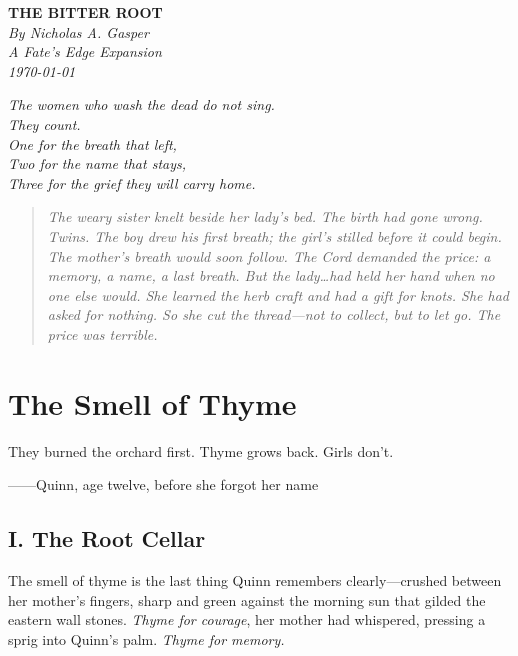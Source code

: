 \documentclass[11pt]{book}
\begin{document}


\thispagestyle{empty}
\vspace*{2cm}
\begin{center}
    {\LARGE\bfseries\color{ashgray}THE BITTER ROOT}\\[1.5cm]
    {\large\itshape By Nicholas A. Gasper}\\[2cm]
    {\large\itshape A Fate's Edge Expansion}\\[1cm]
    {\large\itshape \today}
\end{center}
\newpage

\thispagestyle{empty}
\vspace*{3cm}
\begin{flushright}
    {\large\itshape The women who wash the dead do not sing.\\
    They count.\\
    One for the breath that left,\\
    Two for the name that stays,\\
    Three for the grief they will carry home.}
\end{flushright}
\newpage

\begin{quote}\itshape The weary sister knelt beside her lady's bed. The birth had gone wrong. Twins. The boy drew his first breath; the girl's stilled before it could begin. The mother's breath would soon follow. The Cord demanded the price: a memory, a name, a last breath. But the lady\dots had held her hand when no one else would. She learned the herb craft and had a gift for knots. She had asked for nothing. So she cut the thread---not to collect, but to let go. The price was terrible. \end{quote}

\tableofcontents
\newpage

\chapter*{The Smell of Thyme}
\epigraph{They burned the orchard first. Thyme grows back. Girls don't.}{------Quinn, age twelve, before she forgot her name}

\section*{I. The Root Cellar}
The smell of thyme is the last thing Quinn remembers clearly---crushed between her mother's fingers, sharp and green against the morning sun that gilded the eastern wall stones. \textit{Thyme for courage}, her mother had whispered, pressing a sprig into Quinn's palm. \textit{Thyme for memory.}
\end{document}
